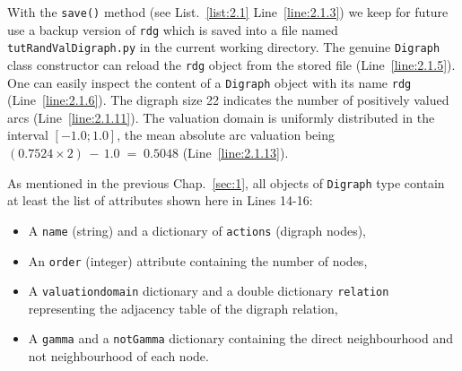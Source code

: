 With the \texttt{save()}  method (see List.~\vref{list:2.1} Line~\ref{line:2.1.3}) we keep for future use a backup version of \texttt{rdg} which is saved into a file named \texttt{tutRandValDi\-graph.py} in the current working directory. The genuine \texttt{Di\-graph} class constructor can reload the \texttt{rdg} object from the stored file (Line~\ref{line:2.1.5}). One can easily inspect the content of a \texttt{Digraph} object with its name \texttt{rdg} (Line~\ref{line:2.1.6}). The digraph size 22 indicates the number of positively valued arcs (Line~\ref{line:2.1.11}). The valuation domain is uniformly distributed in the interval $[-1.0; 1.0]$, the mean absolute arc valuation being $(0.7524 \times 2)\, -\, 1.0 \;=\; 0.5048$ (Line~\ref{line:2.1.13}). 

As mentioned in the previous Chap.~\ref{sec:1}, all objects of \texttt{Digraph} type contain at least the list of attributes shown here in Lines 14-16:
\begin{itemize}[nosep]
\item A \texttt{name} (string) and a dictionary of \texttt{actions} (digraph nodes),
\item An \texttt{order} (integer) attribute containing the number of nodes,
\item A \texttt{valuationdomain} dictionary and a double dictionary \texttt{relation} representing the adjacency table of the digraph relation,
\item A \texttt{gamma} and a {\tt notGamma} dictionary containing the direct neighbourhood and not neighbourhood of each node.
\end{itemize}

